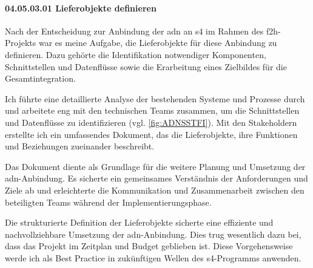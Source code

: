 \paragraph*{04.05.03.01 Lieferobjekte definieren}
\label{para:04.05.03.01_LieferobjekteDefinieren}

\par Nach der Entscheidung zur Anbindung der \gls{adn} an \gls{s4} im Rahmen des \gls{f2h}-Projekts war es meine Aufgabe, die Lieferobjekte für diese Anbindung zu definieren. Dazu gehörte die Identifikation notwendiger Komponenten, Schnittstellen und Datenflüsse sowie die Erarbeitung eines Zielbildes für die Gesamtintegration.

\par Ich führte eine detaillierte Analyse der bestehenden Systeme und Prozesse durch und arbeitete eng mit den technischen Teams zusammen, um die Schnittstellen und Datenflüsse zu identifizieren (vgl. \autoref{fig:ADNSSTFI}). Mit den Stakeholdern erstellte ich ein umfassendes Dokument, das die Lieferobjekte, ihre Funktionen und Beziehungen zueinander beschreibt.

\par Das Dokument diente als Grundlage für die weitere Planung und Umsetzung der \gls{adn}-Anbindung. Es sicherte ein gemeinsames Verständnis der Anforderungen und Ziele ab und erleichterte die Kommunikation und Zusammenarbeit zwischen den beteiligten Teams während der Implementierungsphase.

\par Die strukturierte Definition der Lieferobjekte sicherte eine effiziente und nachvollziehbare Umsetzung der \gls{adn}-Anbindung. Dies trug wesentlich dazu bei, dass das Projekt im Zeitplan und Budget geblieben ist. Diese Vorgehensweise werde ich als Best Practice in zukünftigen Wellen des \gls{s4}-Programms anwenden.